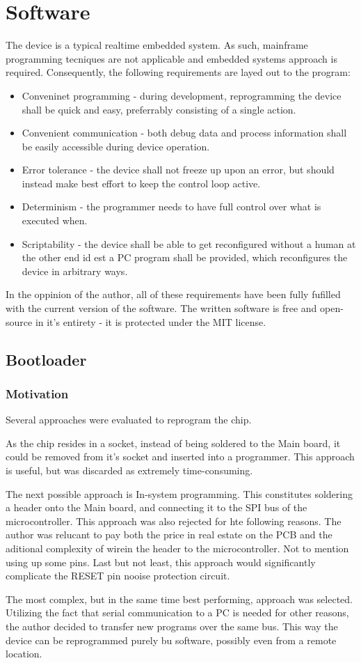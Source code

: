 \section{Software}
The device is a typical realtime embedded system.
As such, mainframe programming tecniques are not applicable and embedded systems approach is required.
Consequently, the following requirements are layed out to the program:
\begin{itemize}
\item{Conveninet programming - during development, reprogramming the device shall be quick and easy, preferrably consisting of a single action.}
\item{Convenient communication - both debug data and process information shall be easily accessible during device operation.}
\item{Error tolerance - the device shall not freeze up upon an error, but should instead make best effort to keep the control loop active.}
\item{Determinism - the programmer needs to have full control over what is executed when.}
\item{Scriptability - the device shall be able to get reconfigured without a human at the other end id est a PC program shall be provided, which reconfigures the device in arbitrary ways.}
\end{itemize}
In the oppinion of the author, all of these requirements have been fully fufilled with the current version of the software.
The written software is free and open-source in it's entirety - it is protected under the MIT license.

\subsection{Bootloader}
\subsubsection{Motivation}
Several approaches were evaluated to reprogram the chip.
\par
As the chip resides in a socket, instead of being soldered to the Main board, it could be removed from it's socket and inserted into a programmer.
This approach is useful, but was discarded as extremely time-consuming.
\par
The next possible approach is In-system programming.
This constitutes soldering a header onto the Main board, and connecting it to the SPI bus of the microcontroller.
This approach was also rejected for hte following reasons.
The author was relucant to pay both the price in real estate on the PCB and the aditional complexity of wirein the header to the microcontroller.
Not to mention using up some pins.
Last but not least, this approach would significantly complicate the RESET pin nooise protection circuit.
\par
The most complex, but in the same time best performing, approach was selected.
Utilizing the fact that serial communication to a PC is needed for other reasons, the author decided to transfer new programs over the same bus.
This way the device can be reprogrammed purely bu software, possibly even from a remote location.

